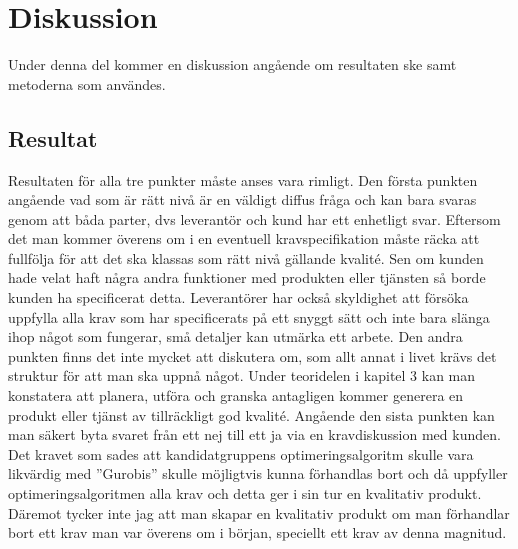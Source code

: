 \section{Diskussion}
Under denna del kommer en diskussion angående om resultaten ske samt metoderna som användes.
\subsection{Resultat}
Resultaten för alla tre punkter måste anses vara rimligt. Den första punkten angående vad som är rätt nivå är en väldigt diffus fråga och kan bara svaras genom att båda parter, dvs leverantör och kund har ett enhetligt svar. Eftersom det man kommer överens om i en eventuell kravspecifikation måste räcka att fullfölja för att det ska klassas som rätt nivå gällande kvalité. Sen om kunden hade velat haft några andra funktioner med produkten eller tjänsten så borde kunden ha specificerat detta. Leverantörer har också skyldighet att försöka uppfylla alla krav som har specificerats på ett snyggt sätt och inte bara slänga ihop något som fungerar, små detaljer kan utmärka ett arbete.
\newline
\newline
Den andra punkten finns det inte mycket att diskutera om, som allt annat i livet krävs det struktur för att man ska uppnå något. Under teoridelen i kapitel 3 kan man konstatera att planera, utföra och granska antagligen kommer generera en produkt eller tjänst av tillräckligt god kvalité.
\newline
\newline
Angående den sista punkten kan man säkert byta svaret från ett nej till ett ja via en kravdiskussion med kunden. Det kravet som sades att kandidatgruppens optimeringsalgoritm skulle vara likvärdig med ''Gurobis'' skulle möjligtvis kunna förhandlas bort och då uppfyller optimeringsalgoritmen alla krav och detta ger i sin tur en kvalitativ produkt. Däremot tycker inte jag att man skapar en kvalitativ produkt om man förhandlar bort ett krav man var överens om i början, speciellt ett krav av denna magnitud. 

